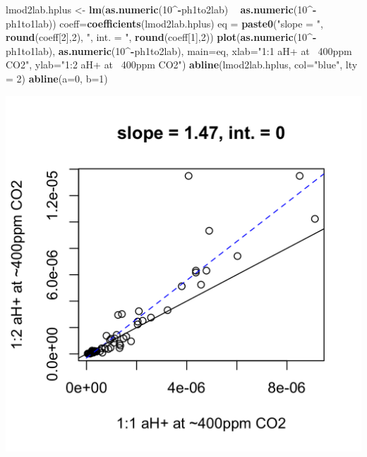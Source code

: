 \documentclass[]{article}
\newenvironment{Shaded}{\begin{snugshade}}{\end{snugshade}}
\newcommand{\DataTypeTok}[1]{\textcolor[rgb]{0.13,0.29,0.53}{#1}}
\newcommand{\DecValTok}[1]{\textcolor[rgb]{0.00,0.00,0.81}{#1}}
\newcommand{\KeywordTok}[1]{\textcolor[rgb]{0.13,0.29,0.53}{\textbf{#1}}}
\newcommand{\NormalTok}[1]{#1}
\newcommand{\OperatorTok}[1]{\textcolor[rgb]{0.81,0.36,0.00}{\textbf{#1}}}
\newcommand{\StringTok}[1]{\textcolor[rgb]{0.31,0.60,0.02}{#1}}
\begin{document}
\begin{Shaded}
\begin{Highlighting}[]
\NormalTok{lmod2lab.hplus <-}\StringTok{ }\KeywordTok{lm}\NormalTok{(}\KeywordTok{as.numeric}\NormalTok{(}\DecValTok{10}\OperatorTok{^-}\NormalTok{ph1to2lab) }\OperatorTok{~}\StringTok{ }\KeywordTok{as.numeric}\NormalTok{(}\DecValTok{10}\OperatorTok{^-}\NormalTok{ph1to1lab))}
\NormalTok{coeff=}\KeywordTok{coefficients}\NormalTok{(lmod2lab.hplus)}
\NormalTok{eq =}\StringTok{ }\KeywordTok{paste0}\NormalTok{(}\StringTok{"slope = "}\NormalTok{, }\KeywordTok{round}\NormalTok{(coeff[}\DecValTok{2}\NormalTok{],}\DecValTok{2}\NormalTok{), }\StringTok{", int. = "}\NormalTok{, }\KeywordTok{round}\NormalTok{(coeff[}\DecValTok{1}\NormalTok{],}\DecValTok{2}\NormalTok{))}
\KeywordTok{plot}\NormalTok{(}\KeywordTok{as.numeric}\NormalTok{(}\DecValTok{10}\OperatorTok{^-}\NormalTok{ph1to1lab), }\KeywordTok{as.numeric}\NormalTok{(}\DecValTok{10}\OperatorTok{^-}\NormalTok{ph1to2lab), }\DataTypeTok{main=}\NormalTok{eq,}
   \DataTypeTok{xlab=}\StringTok{"1:1 aH+ at ~400ppm CO2"}\NormalTok{, }\DataTypeTok{ylab=}\StringTok{"1:2 aH+ at ~400ppm CO2"}\NormalTok{)}
\KeywordTok{abline}\NormalTok{(lmod2lab.hplus, }\DataTypeTok{col=}\StringTok{"blue"}\NormalTok{, }\DataTypeTok{lty =} \DecValTok{2}\NormalTok{)}
\KeywordTok{abline}\NormalTok{(}\DataTypeTok{a=}\DecValTok{0}\NormalTok{, }\DataTypeTok{b=}\DecValTok{1}\NormalTok{)}
\end{Highlighting}
\end{Shaded}

\includegraphics{output-rmd/whitman-figure-request-2-lab-hplus-wisc-1.png}
\end{document}
